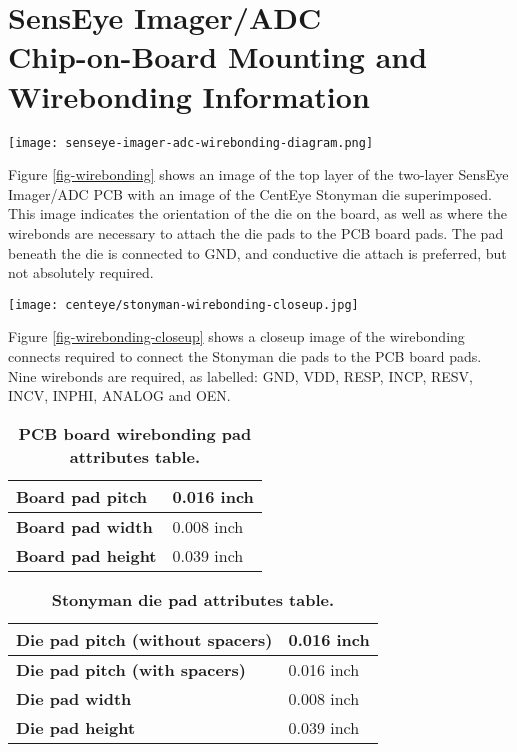 \documentclass[12pt,letterpaper]{report}
\begin{document}
\section*{SensEye Imager/ADC\\Chip-on-Board Mounting and Wirebonding Information}
\begin{figure*}[h!]
 \centering
 \texttt{[image: senseye-imager-adc-wirebonding-diagram.png]}
 \caption[b]{\textbf{SensEye Imager/ADC board wirebonding diagram.}}
 \label{fig-wirebonding}
\end{figure*}

\noindent
Figure \ref{fig-wirebonding} shows an image of the top layer of the two-layer
SensEye Imager/ADC PCB with an image of the CentEye Stonyman die superimposed.
This image indicates the orientation of the die on the board, as well as where
the wirebonds are necessary to attach the die pads to the PCB board pads.  The
pad beneath the die is connected to GND, and conductive die attach is preferred,
but not absolutely required.\\

\begin{figure*}[h!]
 \centering
 \texttt{[image: centeye/stonyman-wirebonding-closeup.jpg]}
 \caption[b]{\textbf{Closeup wirebonding diagram.}}
 \label{fig-wirebonding-closeup}
\end{figure*}

\noindent
Figure \ref{fig-wirebonding-closeup} shows a closeup image of the wirebonding
connects required to connect the Stonyman die pads to the PCB board pads.  Nine
wirebonds are required, as labelled: GND, VDD, RESP, INCP, RESV, INCV, INPHI,
ANALOG and OEN.

\begin{table}[!ht]
   \centering
   \begin{tabular}{|l|l|}
      \hline
      \textbf{Board pad pitch} & 0.016 inch \\
      \hline
      \textbf{Board pad width} & 0.008 inch \\
      \hline
      \textbf{Board pad height} & 0.039 inch \\
      \hline
   \end{tabular}
   \caption{\textbf{PCB board wirebonding pad attributes table.}}
   \label{table-pads-board}
\end{table}

\begin{table}[!ht]
   \centering
   \begin{tabular}{|l|l|}
      \hline
      \textbf{Die pad pitch (without spacers)} & 0.016 inch \\
      \hline
      \textbf{Die pad pitch (with spacers)} & 0.016 inch \\
      \hline
      \textbf{Die pad width} & 0.008 inch \\
      \hline
      \textbf{Die pad height} & 0.039 inch \\
      \hline
   \end{tabular}
   \caption{\textbf{Stonyman die pad attributes table.}}
   \label{table-pads-die}
\end{table}
\end{document}
